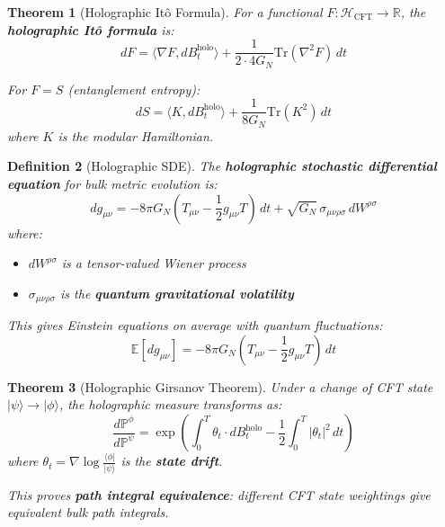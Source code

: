 \documentclass[12pt,a4paper]{article}
\newtheorem{theorem}{Theorem}[section]
\newtheorem{definition}[theorem]{Definition}
\begin{document}
\begin{theorem}[Holographic It\^o Formula]\label{thm:holo-ito}
For a functional $F: \mathcal{H}_{\text{CFT}} \to \mathbb{R}$, the \textbf{holographic It\^o formula} is:
\begin{equation}
dF = \langle \nabla F, dB_t^{\text{holo}} \rangle + \frac{1}{2 \cdot 4G_N} \text{Tr}(\nabla^2 F) \, dt
\end{equation}

For $F = S$ (entanglement entropy):
\begin{equation}
dS = \langle K, dB_t^{\text{holo}} \rangle + \frac{1}{8G_N} \text{Tr}(K^2) \, dt
\end{equation}
where $K$ is the modular Hamiltonian.
\end{theorem}

\begin{definition}[Holographic SDE]\label{def:holo-sde}
The \textbf{holographic stochastic differential equation} for bulk metric evolution is:
\begin{equation}
dg_{\mu\nu} = -8\pi G_N (T_{\mu\nu} - \frac{1}{2}g_{\mu\nu}T) \, dt + \sqrt{G_N} \, \sigma_{\mu\nu\rho\sigma} \, dW^{\rho\sigma}
\end{equation}
where:
\begin{itemize}
    \item $dW^{\rho\sigma}$ is a tensor-valued Wiener process
    \item $\sigma_{\mu\nu\rho\sigma}$ is the \textbf{quantum gravitational volatility}
\end{itemize}

This gives Einstein equations on average with quantum fluctuations:
\begin{equation}
\mathbb{E}[dg_{\mu\nu}] = -8\pi G_N (T_{\mu\nu} - \frac{1}{2}g_{\mu\nu}T) \, dt
\end{equation}
\end{definition}

\begin{theorem}[Holographic Girsanov Theorem]\label{thm:holo-girsanov}
Under a change of CFT state $|\psi\rangle \to |\phi\rangle$, the holographic measure transforms as:
\begin{equation}
\frac{d\mathbb{P}^\phi}{d\mathbb{P}^\psi} = \exp\left( \int_0^T \theta_t \cdot dB_t^{\text{holo}} - \frac{1}{2} \int_0^T |\theta_t|^2 \, dt \right)
\end{equation}
where $\theta_t = \nabla \log \frac{\langle\phi|}{|\psi\rangle}$ is the \textbf{state drift}.

This proves \textbf{path integral equivalence}: different CFT state weightings give equivalent bulk path integrals.
\end{theorem}
\end{document}
